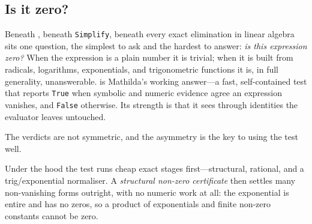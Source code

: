 \subsection{Is it zero?}
\label{ssec:alg-possiblezeroq}

Beneath , beneath \texttt{Simplify}, beneath every exact elimination in linear
algebra sits one question, the simplest to ask and the hardest to answer: \emph{is this
expression zero?} When the expression is a plain number it is trivial; when it is built
from radicals, logarithms, exponentials, and trigonometric functions it is, in full
generality, unanswerable.  is
Mathilda's working answer---a fast, self-contained test that reports \texttt{True} when
symbolic and numeric evidence agree an expression vanishes, and \texttt{False} otherwise.
Its strength is that it sees through identities the evaluator leaves untouched.

\begin{codepairs}
\end{codepairs}

The verdicts are not symmetric, and the asymmetry is the key to using the test well.

\begin{codepairs}
\end{codepairs}

Under the hood the test runs cheap exact stages first---structural, rational, and a
trig/exponential normaliser. A \emph{structural non-zero
certificate} then settles many non-vanishing forms
outright, with no numeric work at all: the exponential is entire and has no zeros, so a
product of exponentials and finite non-zero constants cannot be zero.

\begin{codepairs}
\end{codepairs}

